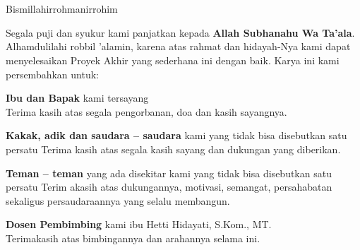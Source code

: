 \chapter*{\Persembahan}
\begin{center}
Bismillahirrohmanirrohim
\end{center}
\begin{center}
Segala puji dan syukur kami panjatkan kepada \textbf{Allah Subhanahu Wa Ta’ala}. Alhamdulilahi robbil ’alamin, karena atas rahmat dan hidayah-Nya kami dapat menyelesaikan Proyek Akhir yang sederhana ini dengan baik. Karya ini kami persembahkan untuk:
\end{center}

\begin{center}
\textbf{Ibu dan Bapak} kami tersayang
\\
Terima kasih atas segala pengorbanan, doa dan kasih sayangnya.
\end{center}


\begin{center}
\textbf{Kakak, adik dan saudara – saudara} kami yang tidak bisa disebutkan satu persatu
Terima kasih atas segala kasih sayang dan dukungan yang diberikan.
\end{center}

\begin{center}
\textbf{Teman – teman} yang ada disekitar kami yang tidak bisa disebutkan satu persatu
Terim akasih atas dukungannya, motivasi, semangat, persahabatan sekaligus persaudaraannya yang selalu membangun.
\end{center}

\begin{center}
\textbf{Dosen Pembimbing} kami ibu Hetti Hidayati, S.Kom., MT.
\\
Terimakasih atas bimbingannya dan arahannya selama ini.
\end{center}

